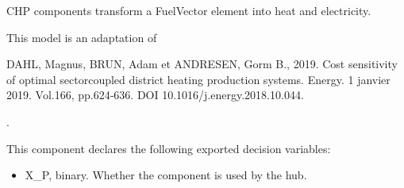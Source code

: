 \documentclass[letterpaper,10pt,english]{sphinxmanual}
\begin{document}
\begin{fulllineitems}
\label{\detokenize{generated/tamos.production.CHP:tamos.production.CHP}}
\pysigstartsignatures
{}
\pysigstopsignatures{}

\begin{fulllineitems}
\label{\detokenize{generated/tamos.production.CHP:tamos.production.CHP.__init__}}
\pysigstartsignatures
{}
\pysigstopsignatures
\sphinxAtStartPar
CHP components transform a FuelVector element into heat and electricity.

\sphinxAtStartPar
This model is an adaptation of %
\begin{footnote}[1]\sphinxAtStartFootnote
DAHL, Magnus, BRUN, Adam et ANDRESEN, Gorm B., 2019.
Cost sensitivity of optimal sector\sphinxhyphen{}coupled district heating production systems.
Energy. 1 janvier 2019. Vol.166, pp.624‑636. DOI 10.1016/j.energy.2018.10.044.
%
\end{footnote}.

\sphinxAtStartPar
This component declares the following exported decision variables:
\begin{itemize}
\item {} 
\sphinxAtStartPar
X\_P, binary.
Whether the component is used by the hub.


\end{itemize}
\end{fulllineitems}
\end{fulllineitems}
\end{document}
